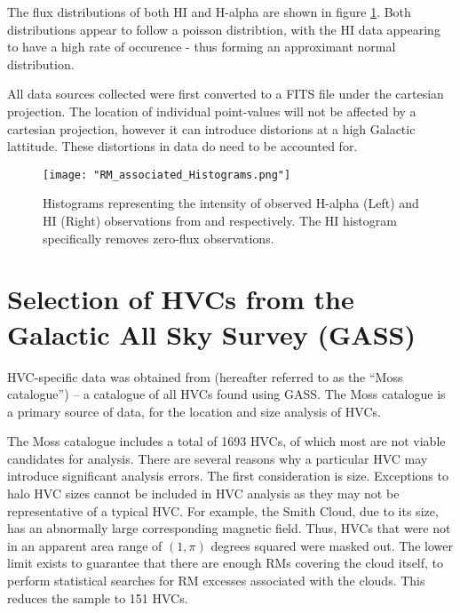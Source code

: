 The flux distributions of both HI and H-alpha are shown in figure \ref{fig:h1_ha}. Both distributions appear to follow a poisson distribtion, with the HI data appearing to have a high rate of occurence - thus forming an approximant normal distribution.


All data sources collected were first converted to a FITS file under the cartesian projection. The location of individual point-values will not be affected by a cartesian projection, however it can introduce distorions at a high Galactic lattitude. These distortions in data do need to be accounted for.

\begin{figure}
    \texttt{[image: "RM\_associated\_Histograms.png"]}
    \centering
    \caption{Histograms representing the intensity of observed H-alpha (Left) and HI (Right) observations from \cite{ID42} and \cite{ID6} respectively. The HI histogram specifically removes zero-flux observations.}
    \label{fig:h1_ha}
\end{figure}

\section{Selection of HVCs from the Galactic All Sky Survey (GASS)}
\label{sec:hvc_sel}

HVC-specific data was obtained from \cite{ID3} (hereafter referred to as the “Moss catalogue”) – a catalogue of all HVCs found using GASS. The Moss catalogue is a primary source of data, for the location and size analysis of HVCs.


The Moss catalogue includes a total of 1693 HVCs, of which most are not viable candidates for analysis. There are several reasons why a particular HVC may introduce significant analysis errors. The first consideration is size. Exceptions to halo HVC sizes cannot be included in HVC analysis as they may not be representative of a typical HVC. For example, the Smith Cloud, due to its size, has an abnormally large corresponding magnetic field. Thus, HVCs that were not in an apparent area range of $(1,\pi)$ degrees squared were masked out. The lower limit exists to guarantee that there are enough RMs covering the cloud itself, to perform statistical searches for RM excesses associated with the clouds. This reduces the sample to 151 HVCs.


